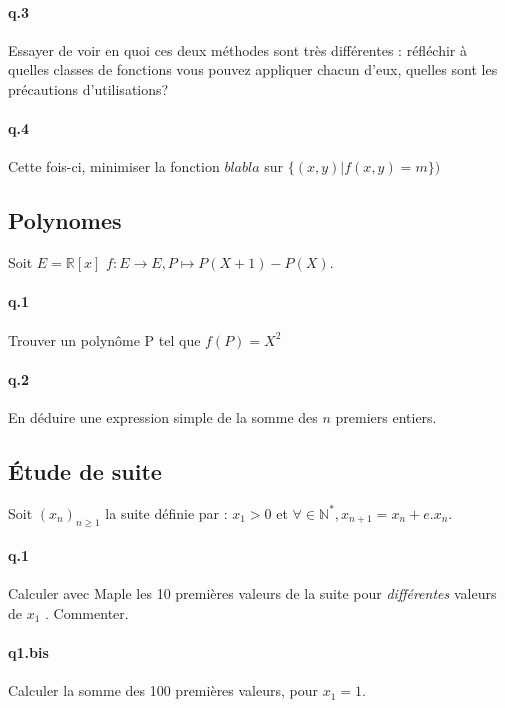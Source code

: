 \documentclass[10pt,a4paper]{article}
\begin{document}
\paragraph{q.3} Essayer de voir en quoi ces deux méthodes sont très différentes : réfléchir à quelles classes de fonctions vous pouvez appliquer chacun d'eux, quelles sont les précautions d'utilisations?
\paragraph{q.4}
Cette fois-ci, minimiser la fonction $blabla$ sur $\{(x,y) | f(x,y)= m \})$
%

%
\subsection{Polynomes}
Soit $E=\mathbb{R}[x]$ $f: E \rightarrow E , P \mapsto P(X+1)-P(X)$.
\paragraph{q.1} Trouver un polynôme P tel que $f(P)=X^2$
\paragraph{q.2} En déduire une expression simple de la somme des $n$ premiers entiers.


\subsection{Étude de suite}
Soit $(x_n)_{n\geq1}$ la suite définie par : $x_1 > 0$ et $\forall \in \mathbb{N}^*, x_{n+1} = x_n + e.x_n$.
\paragraph{q.1} Calculer avec Maple les 10 premières valeurs de la suite pour \emph{différentes} valeurs de $x_1$ . Commenter.

\paragraph{q1.bis} Calculer la somme des 100 premières valeurs, pour $x_1=1$.
\end{document}
